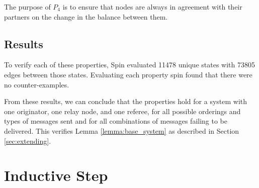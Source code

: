 \documentclass[runningheads]{llncs}
\begin{document}
The purpose of $P_4$ is to ensure that nodes are always in agreement with their partners on the change in the balance between them. 



\subsection{Results}

To verify each of these properties, Spin evaluated 
11478 unique states with 73805 edges between those states. Evaluating each property spin found that there were no counter-examples. 

From these results, we can conclude that the properties hold for a system with one originator, one relay node, and one referee, for all possible orderings and types of messages sent and for all combinations of messages failing to be delivered. This verifies Lemma \ref{lemma:base_system} as described in Section \ref{sec:extending}.

\section{Inductive Step}
\label{sec:inductive_step}
\end{document}

